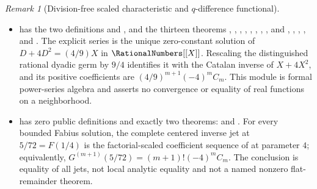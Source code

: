 \documentclass[11pt,oneside]{article}
\theoremstyle{definition}
\theoremstyle{remark}
\newtheorem{remark}[remark]{Remark}
\begin{document}
\begin{remark}[Division-free scaled characteristic and \(q\)-difference functional]
\begin{itemize}
\item {} has the two definitions
 and
, and the thirteen theorems
,
,
,
,
,
,
,
, and
,
,
,
, and
.  The explicit series is the unique
zero-constant solution of \(D+4D^2=(4/9)X\) in \(\RationalNumbers[[X]]\).  Rescaling the
distinguished rational dyadic germ by \(9/4\) identifies it with the Catalan inverse of
\(X+4X^2\), and its positive coefficients are \((4/9)^{m+1}(-4)^m C_m\).
This module is formal power-series algebra and asserts no convergence or equality of real
functions on a neighborhood.

\item {} has zero public definitions and exactly two
theorems:
 and
.  For every bounded Fabius
solution, the complete centered inverse jet at \(5/72=F(1/4)\) is the factorial-scaled
coefficient sequence of  at parameter \(4\); equivalently,
\(G^{(m+1)}(5/72)=(m+1)!(-4)^m C_m\).  The conclusion is equality of all jets, not
local analytic equality and not a named nonzero flat-remainder theorem.


\end{itemize}
\end{remark}
\end{document}
